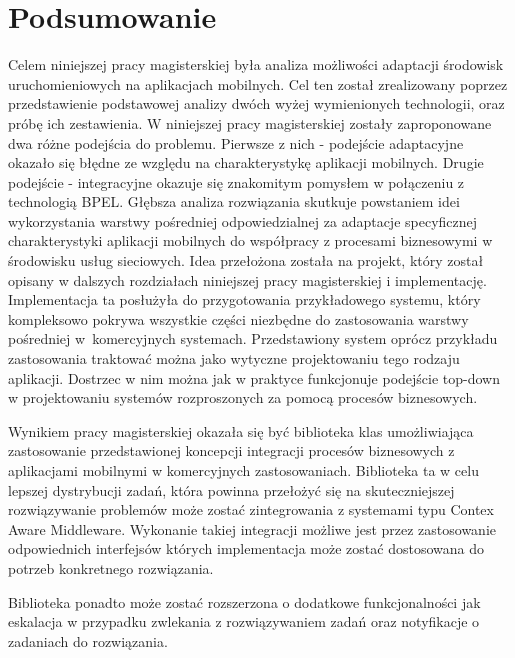 \chapter{Podsumowanie }
\label{cha:podsumowanie}

Celem niniejszej pracy magisterskiej była analiza możliwości adaptacji środowisk uruchomieniowych na aplikacjach mobilnych. Cel ten został zrealizowany poprzez przedstawienie podstawowej analizy dwóch wyżej wymienionych technologii, oraz próbę ich zestawienia. W niniejszej pracy magisterskiej zostały zaproponowane dwa różne podejścia do problemu. Pierwsze z nich - podejście adaptacyjne okazało się błędne ze względu na charakterystykę aplikacji mobilnych. Drugie podejście - integracyjne okazuje się znakomitym pomysłem w połączeniu z technologią BPEL. Głębsza analiza rozwiązania skutkuje powstaniem idei wykorzystania warstwy pośredniej odpowiedzialnej za adaptacje specyficznej charakterystyki aplikacji mobilnych do współpracy z procesami biznesowymi w środowisku usług sieciowych. Idea przełożona została na projekt, który został opisany w dalszych rozdziałach niniejszej pracy magisterskiej i implementację. Implementacja ta posłużyła do przygotowania przykładowego systemu, który kompleksowo pokrywa wszystkie części niezbędne do zastosowania warstwy pośredniej w~komercyjnych systemach. Przedstawiony system oprócz przykładu zastosowania traktować można jako wytyczne projektowaniu tego rodzaju aplikacji. Dostrzec w nim można jak w praktyce funkcjonuje podejście top-down w projektowaniu systemów rozproszonych za pomocą procesów biznesowych. 

Wynikiem pracy magisterskiej okazała się być biblioteka klas umożliwiająca zastosowanie przedstawionej koncepcji integracji procesów biznesowych z aplikacjami mobilnymi w komercyjnych zastosowaniach. Biblioteka ta w celu lepszej dystrybucji zadań, która powinna przełożyć się na skuteczniejszej rozwiązywanie problemów może zostać zintegrowania z systemami typu Contex Aware Middleware. Wykonanie takiej integracji możliwe jest przez zastosowanie odpowiednich interfejsów których implementacja może zostać dostosowana do potrzeb konkretnego rozwiązania. 

Biblioteka ponadto może zostać rozszerzona o dodatkowe funkcjonalności jak eskalacja w przypadku zwlekania z rozwiązywaniem zadań oraz notyfikacje o zadaniach do rozwiązania. 
